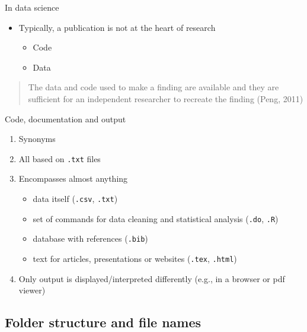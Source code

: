 \documentclass[ignorenonframetext,]{beamer}
\begin{document}
\begin{frame}{In data science}

\begin{itemize}
\item
  Typically, a publication is not at the heart of research

  \begin{itemize}
  \itemsep1pt\parskip0pt
  \item
    Code
  \item
    Data
  \end{itemize}
\end{itemize}

\begin{quote}
The data and code used to make a finding are available and they are
sufficient for an independent researcher to recreate the finding (Peng,
2011)
\end{quote}

\end{frame}

\begin{frame}{Code, documentation and output}

\begin{enumerate}
\def\labelenumi{\arabic{enumi}.}
\item
  Synonyms
\item
  All based on \texttt{.txt} files
\item
  Encompasses almost anything

  \begin{itemize}
  \itemsep1pt\parskip0pt
  \item
    data itself (\texttt{.csv}, \texttt{.txt})
  \item
    set of commands for data cleaning and statistical analysis
    (\texttt{.do}, \texttt{.R})
  \item
    database with references (\texttt{.bib})
  \item
    text for articles, presentations or websites (\texttt{.tex},
    \texttt{.html})
  \end{itemize}
\item
  Only output is displayed/interpreted differently (e.g., in a browser
  or pdf viewer)
\end{enumerate}

\end{frame}

\subsection{Folder structure and file
names}\label{folder-structure-and-file-names}
\end{document}
